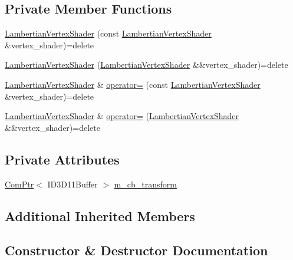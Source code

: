 \subsection*{Private Member Functions}
\begin{DoxyCompactItemize}
\item 
\hyperlink{classmage_1_1_lambertian_vertex_shader_add164d66906e307d95232b2c41567a21}{Lambertian\+Vertex\+Shader} (const \hyperlink{classmage_1_1_lambertian_vertex_shader}{Lambertian\+Vertex\+Shader} \&vertex\+\_\+shader)=delete
\item 
\hyperlink{classmage_1_1_lambertian_vertex_shader_a1202feaaeb64148207e2fb10290a09c8}{Lambertian\+Vertex\+Shader} (\hyperlink{classmage_1_1_lambertian_vertex_shader}{Lambertian\+Vertex\+Shader} \&\&vertex\+\_\+shader)=delete
\item 
\hyperlink{classmage_1_1_lambertian_vertex_shader}{Lambertian\+Vertex\+Shader} \& \hyperlink{classmage_1_1_lambertian_vertex_shader_a974b43346ab5d8081d9101f715e7670d}{operator=} (const \hyperlink{classmage_1_1_lambertian_vertex_shader}{Lambertian\+Vertex\+Shader} \&vertex\+\_\+shader)=delete
\item 
\hyperlink{classmage_1_1_lambertian_vertex_shader}{Lambertian\+Vertex\+Shader} \& \hyperlink{classmage_1_1_lambertian_vertex_shader_ae0a53e712856923403c1f7542941df6e}{operator=} (\hyperlink{classmage_1_1_lambertian_vertex_shader}{Lambertian\+Vertex\+Shader} \&\&vertex\+\_\+shader)=delete
\end{DoxyCompactItemize}
\subsection*{Private Attributes}
\begin{DoxyCompactItemize}
\item 
\hyperlink{namespacemage_ae74f374780900893caa5555d1031fd79}{Com\+Ptr}$<$ I\+D3\+D11\+Buffer $>$ \hyperlink{classmage_1_1_lambertian_vertex_shader_aae0f2411821315d89eeb982e6c30c22e}{m\+\_\+cb\+\_\+transform}
\end{DoxyCompactItemize}
\subsection*{Additional Inherited Members}


\subsection{Constructor \& Destructor Documentation}
\hypertarget{classmage_1_1_lambertian_vertex_shader_a07be678df09024a53b3f5fc323a7f793}{}\label{classmage_1_1_lambertian_vertex_shader_a07be678df09024a53b3f5fc323a7f793} 
